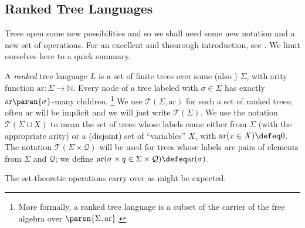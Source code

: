 \subsection{Ranked Tree Languages}

Trees open some new possibilities and so we shall need some new notation and
a new set of operations.  For an excellent and thourough introduction, see
\cite[Preliminaries]{tata}.  We limit ourselves here to a quick summary.

A {\em ranked} tree language $L$ is a set of finite trees over some
 (also ) $\Sigma$, with arity function
$\mbox{ar} : \Sigma \to \mathbb{N}$.  Every node of a tree labeled with
$\sigma \in \Sigma$ has exactly $\mbox{ar}\paren{\sigma}$-many children.%
%
\footnote{More formally, a ranked tree language is a subset of the carrier
of the free algebra over $\paren{\Sigma,\mbox{ar}}$.} We use
$\mathcal{T}(\Sigma,\mbox{ar})$ for such a set of ranked trees; often
$\mbox{ar}$ will be implicit and we will just write $\mathcal{T}(\Sigma)$.
We use the notation $\mathcal{T}(\Sigma \sqcup X)$ to mean the set of trees
whose labels come either from $\Sigma$ (with the appropriate arity) or a
(disjoint) set of ``variables'' $X$, with $\mbox{ar}(x \in X) \defeq 0$.
The notation $\mathcal{T}(\Sigma \times \mathcal{Q})$ will be used for trees
whose labels are pairs of elements from $\Sigma$ and $\mathcal{Q}$; we
define $\mbox{ar}(\sigma \times q \in \Sigma \times \mathcal{Q}) \defeq
\mbox{ar}(\sigma)$.

The set-theoretic operations carry over as might be expected.
